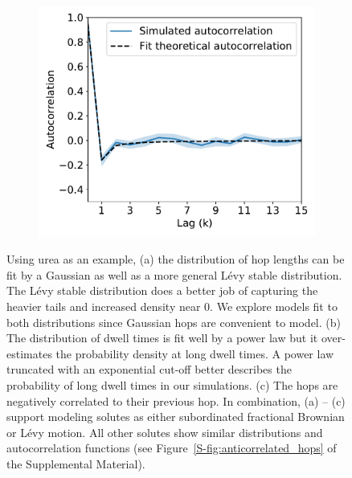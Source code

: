 \documentclass[aps,pre,preprint,groupedaddress,longbibliography]{revtex4-2}
\begin{document}
\begin{figure}
\begin{subfigure}{0.325\textwidth}
  \includegraphics[width=\textwidth]{URE_hop_acf.pdf}
  \caption{}\label{fig:hop_acf}
  \end{subfigure}
  \caption{Using urea as an example, (a) the distribution of hop lengths can be fit by 
  a Gaussian as well as a more general L\'evy stable distribution. The L\'evy stable
  distribution does a better job of capturing the heavier tails and increased density
  near 0. We explore models fit to both distributions since Gaussian hops are convenient to
  model. (b) The distribution of dwell times is fit well by a power law but it
  over-estimates the probability density at long dwell times. A power law truncated with
  an exponential cut-off better describes the probability of long dwell times in 
  our simulations. (c) The hops are negatively correlated to their previous hop. In
  combination, (a) -- (c) support modeling solutes as either subordinated fractional
  Brownian or L\'evy motion. All other solutes show similar distributions and autocorrelation
  functions (see Figure~\ref{S-fig:anticorrelated_hops} of the Supplemental Material).
  }\label{fig:anticorrelated_hops}
  \end{figure}
  
\end{document}
